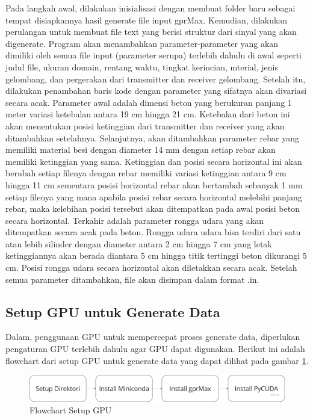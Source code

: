 Pada langkah awal, dilakukan inisialisasi dengan membuat folder baru sebagai tempat disiapkannya hasil generate file input gprMax. Kemudian, dilakukan perulangan untuk membuat file text yang berisi struktur dari sinyal yang akan digenerate. Program akan menambahkan parameter-parameter yang akan dimiliki oleh semua file input (parameter serupa) terlebih dahulu di awal seperti judul file, ukuran domain, rentang waktu, tingkat kerincian, mterial, jenis gelombang, dan pergerakan dari transmitter dan receiver gelombang. Setelah itu, dilakukan penambahan baris kode dengan parameter yang sifatnya akan divariasi secara acak. Parameter awal adalah dimensi beton yang berukuran panjang 1 meter variasi ketebalan antara 19 cm hingga 21 cm. Ketebalan dari beton ini akan menentukan posisi ketinggian dari transmitter dan receiver yang akan ditambahkan setelahnya. Selanjutnya, akan ditambahkan parameter rebar yang memiliki material besi dengan diameter 14 mm dengan setiap rebar akan memiliki ketinggian yang sama. Ketinggian dan posisi secara horizontal ini akan berubah setiap filenya dengan rebar memiliki variasi ketinggian antara 9 cm hingga 11 cm sementara posisi horizontal rebar akan bertambah sebanyak 1 mm setiap filenya yang mana apabila posisi rebar secara horizontal melebihi panjang rebar, maka kelebihan posisi tersebut akan ditempatkan pada awal posisi beton secara horizontal. Terkahir adalah parameter rongga udara yang akan ditempatkan secara acak pada beton. Rongga udara udara bisa terdiri dari satu atau lebih silinder dengan diameter antara 2 cm hingga 7 cm yang letak ketinggiannya akan berada diantara 5 cm hingga titik tertinggi beton dikurangi 5 cm. Posisi rongga udara secara horizontal akan diletakkan secara acak. Setelah semua parameter ditambahkan, file akan disimpan dalam format .in.

\subsection{Setup GPU untuk Generate Data}
Dalam, penggunaan GPU untuk mempercepat proses generate data, diperlukan pengaturan GPU terlebih dahulu agar GPU dapat digunakan. Berikut ini adalah flowchart dari setup GPU untuk generate data yang dapat dilihat pada gambar \ref{fig:flowgpu}.

\begin{figure} [H] \centering
  \includegraphics[scale=0.1]{gambar/bab3/flowgpu.png}
  \caption{Flowchart Setup GPU}
  \label{fig:flowgpu}
\end{figure}


